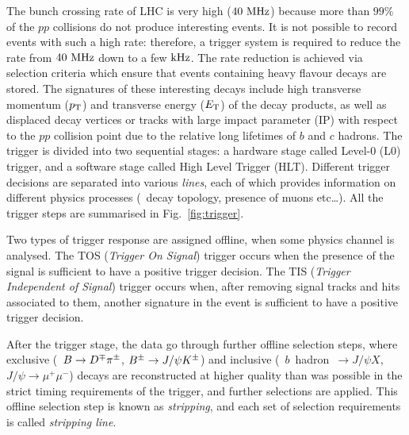 The bunch crossing rate of LHC is very high ($40~\rm MHz$) because more than $99\%$ of the $pp$ collisions do not produce interesting events. It is not possible to record events with such a high rate: therefore, a trigger system \cite{Trigger} is required to reduce the rate from $40~\rm MHz$ down to a few $\rm kHz$. The rate reduction is achieved via selection criteria which ensure that events containing heavy flavour decays are stored. The signatures of these interesting decays include high transverse momentum ($\mbox{$p_{\rm T}$}$) and transverse energy ($E_{\rm T}$) of the decay products, as well as displaced decay vertices 
or tracks with large impact parameter (IP) with respect to the $pp$ collision point due to the relative long lifetimes of $b$ and $c$ hadrons. The trigger is divided into two sequential stages: a hardware stage called Level-0 (L0) trigger, and a software stage called High Level Trigger (HLT). Different trigger decisions are separated into various \emph{lines}, each of which provides information on different physics processes (\eg~decay topology, presence of muons etc\dots). All the trigger steps are summarised in Fig.~\ref{fig:trigger}.

Two types of trigger response are assigned offline, when some physics channel is analysed. The TOS (\emph{Trigger On Signal}) trigger occurs when the presence of the signal is sufficient to have a positive trigger decision. The TIS (\emph{Trigger Independent of Signal}) trigger occurs when, after removing signal tracks and hits associated to them, another signature in the event is sufficient to have a positive trigger decision.

After the trigger stage, the data go through further offline selection steps, where exclusive (\eg~$B\rightarrow D^\mp\pi^\pm$, $B^\pm\rightarrow J/\psi K^{\pm}$) and inclusive (\eg~$b$~hadron~$\to J/\psi X$, $J/\psi\to\mu^+\mu^-$) decays are reconstructed at higher quality than was possible in the strict timing requirements of the trigger, and further selections are applied.
This offline selection step is known as \emph{stripping}, and each set of selection requirements is called \emph{stripping line}.

